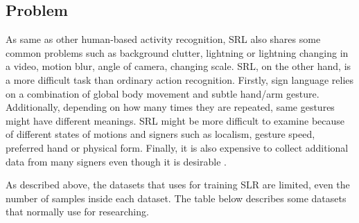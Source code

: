 \documentclass[a4paper, 12pt]{article}
\begin{document}
\subsection{Problem}
As same as other human-based activity recognition, SRL also shares some common problems such as background clutter, lightning or lightning changing in a video, motion blur, angle of camera, changing scale. 
SRL, on the other hand, is a more difficult task than ordinary action recognition. Firstly, sign language relies on a combination of global body movement and subtle hand/arm gesture. Additionally, depending on how many times they are repeated, same gestures might have different meanings. SRL might be more difficult to examine because of different states of motions and signers such as localism, gesture speed, preferred hand or physical form. Finally, it is also expensive to collect additional data from many signers even though it is desirable \citep{jiang2021skeleton}.

As described above, the datasets that uses for training SLR are limited, even the number of samples inside each dataset. The table below describes some datasets that normally use for researching.
\end{document}

